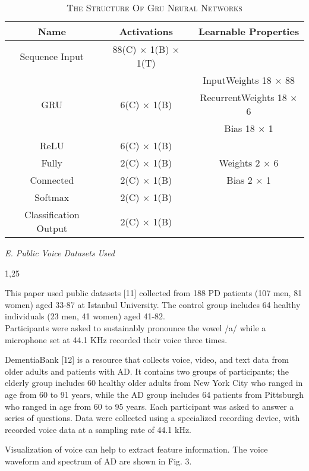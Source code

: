    \begin{table}[!h]
       \centering
        \caption{\small\textsc{The Structure Of Gru Neural Networks\\}}
       \tiny{
       \begin{tabular}{|c|c|c|}
       \hline
          \textbf{Name}  &  \textbf{Activations} &  \textbf{Learnable Properties}\\
           \hline
           Sequence Input & 88(C) × 1(B) × 1(T) & \\
           \hline
             &  &InputWeights 18 × 88 \\
            GRU & 6(C) × 1(B) & RecurrentWeights 18 × 6\\
             &  & Bias 18 × 1\\
           \hline
            ReLU  & 6(C) × 1(B) & \\
            \hline
            Fully   & 2(C) × 1(B)  & Weights 2 × 6 \\
            Connected  & 2(C) × 1(B)  & Bias 2 × 1 \\
           \hline
            Softmax  & 2(C) × 1(B)  &\\
           \hline
            Classification Output   & 2(C) × 1(B)  &\\
           \hline
       \end{tabular}}
   \end{table}

\textit{E. Public Voice Datasets Used}  
\begin{spacing}{1,25}
\end{spacing}

\par
This paper used public datasets [11] collected from
188 PD patients (107 men, 81 women) aged 33-87
at Istanbul University. The control group includes 64
healthy individuals (23 men, 41 women) aged 41-82.\\
Participants were asked to sustainably pronounce the
vowel /a/ while a microphone set at 44.1 KHz recorded
their voice three times.
\par
DementiaBank [12] is a resource that collects voice,
video, and text data from older adults and patients with
AD. It contains two groups of participants; the elderly
group includes 60 healthy older adults from New York
City who ranged in age from 60 to 91 years, while
the AD group includes 64 patients from Pittsburgh who
ranged in age from 60 to 95 years. Each participant was
asked to answer a series of questions. Data were collected
using a specialized recording device, with recorded voice
data at a sampling rate of 44.1 kHz.
\par
Visualization of voice can help to extract feature
information. The voice waveform and spectrum of AD
are shown in Fig. 3.

